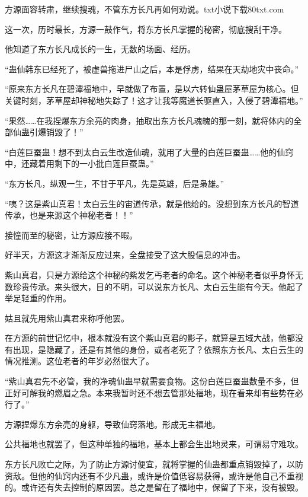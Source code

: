 
\begin{this_body}

方源面容转肃，继续搜魂，不管东方长凡再如何劝说。txt小说下载80txt.com

这一次，历时最长，方源一鼓作气，将东方长凡掌握的秘密，彻底搜刮干净。

他知道了东方长凡成长的一生，无数的场面、经历。

“蛊仙韩东已经死了，被虚兽拖进尸山之后，本是俘虏，结果在天劫地灾中丧命。”

“原来东方长凡在碧潭福地中，早就做了布置，是以六转仙蛊屋茅草屋为核心。但关键时刻，茅草屋却神秘地失踪了！这才让我等魔道长驱直入，入侵了碧潭福地。”

“果然……在我捏爆东方余亮的肉身，抽取出东方长凡魂魄的那一刻，就将体内的全部仙蛊引爆销毁了！”

“白莲巨蚕蛊！想不到太白云生改造仙魂，就用了大量的白莲巨蚕蛊……他的仙窍中，还藏着用剩下的一小批白莲巨蚕蛊。”

“东方长凡，纵观一生，不甘于平凡，先是英雄，后是枭雄。”

“咦？这是紫山真君！太白云生的宙道传承，就是他给的。没想到东方长凡的智道传承，也是来源这个神秘老者！！”

接憧而至的秘密，让方源应接不暇。

好半天，方源这才渐渐反应过来，全盘接受了这大股信息的冲击。

紫山真君，只是方源给这个神秘的紫发乞丐老者的命名。这个神秘老者似乎身怀无数珍贵传承。来头很大，目的不明，可以说东方长凡、太白云生能有今天。他起了举足轻重的作用。

姑且就先用紫山真君来称呼他罢。

在方源的前世记忆中，根本就没有这个紫山真君的影子，就算是五域大战，他都没有出现，是隐藏了，还是有其他的身份，或者老死了？依照东方长凡、太白云生的情况推测。这位老者的年岁必然很大了。

“紫山真君先不必管，我的净魂仙蛊早就需要食物。这份白莲巨蚕蛊数量不多，但正好可解我的燃眉之急。本来我暂时还不想去管那处福地，现在看来却有些势在必行了。”

方源捏爆东方余亮的身躯，导致仙窍落地。形成无主福地。

公共福地也就罢了，但这种单独的福地，基本上都会生出地灵来，可谓易守难攻。

东方长凡败亡之际，为了防止方源讨便宜，就将掌握的仙蛊都重点销毁掉了，以防资敌。但他的仙窍内还有不少凡蛊，或许是价值低容易获得，或许是他自己不重视的。或许还有失去控制的原因罢。总之是留在了福地中，保留了下来，没有被毁。


\end{this_body}
